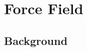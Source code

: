 \documentclass[11pt]{book}
\begin{document}
\tableofcontents
\newpage


\chapter{Force Field}


\section{Background}
\end{document}
